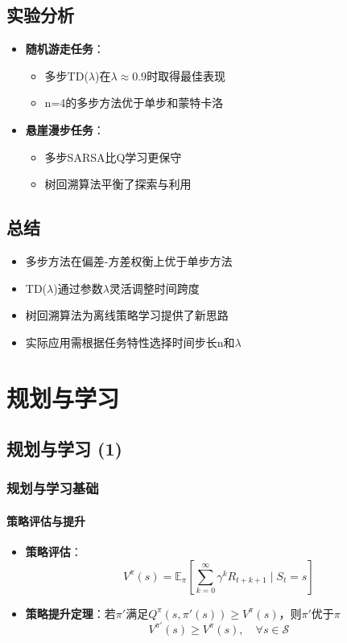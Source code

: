 \subsection{实验分析}
\begin{itemize}
    \item \textbf{随机游走任务}：
        \begin{itemize}
            \item 多步TD($\lambda$)在$\lambda \approx 0.9$时取得最佳表现
            \item n=4的多步方法优于单步和蒙特卡洛
        \end{itemize}
    \item \textbf{悬崖漫步任务}：
        \begin{itemize}
            \item 多步SARSA比Q学习更保守
            \item 树回溯算法平衡了探索与利用
        \end{itemize}
\end{itemize}

\subsection{总结}
\begin{itemize}
    \item 多步方法在偏差-方差权衡上优于单步方法
    \item TD($\lambda$)通过参数$\lambda$灵活调整时间跨度
    \item 树回溯算法为离线策略学习提供了新思路
    \item 实际应用需根据任务特性选择时间步长n和$\lambda$
\end{itemize}

\section{规划与学习}
\subsection{规划与学习 (1)}
\subsubsection{规划与学习基础}
\paragraph{策略评估与提升}
\begin{itemize}
    \item \textbf{策略评估}：
        \[
        V^\pi(s) = \mathbb{E}_\pi\left[\sum_{k=0}^\infty \gamma^k R_{t+k+1} \mid S_t=s\right]
        \]
    \item \textbf{策略提升定理}：若$\pi'$满足$Q^\pi(s,\pi'(s)) \geq V^\pi(s)$，则$\pi'$优于$\pi$
        \[
        V^{\pi'}(s) \geq V^\pi(s),\quad \forall s \in \mathcal{S}
        \]
\end{itemize}


